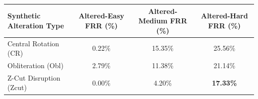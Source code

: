 \begin{tabular}{lccc}
\toprule
\textbf{Synthetic Alteration Type} & \textbf{Altered-Easy FRR (\%)} & \textbf{Altered-Medium FRR (\%)} & \textbf{Altered-Hard FRR (\%)} \\
\midrule
Central Rotation (CR) & 0.22\% & 15.35\% & 25.56\% \\
Obliteration (Obl) & 2.79\% & 11.38\% & 21.14\% \\
Z-Cut Disruption (Zcut) & 0.00\% & 4.20\% & \textbf{17.33\%} \\
\bottomrule
\end{tabular}